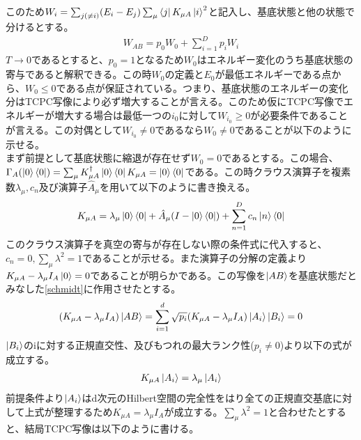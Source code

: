 \documentclass[a4paper,10.5pt]{article}
\numberwithin{equation}{section}
\begin{document}
このため$W_{i}=\sum_{j(\neq i)}(E_{i}-E_{j})\sum_{\mu}\bra{j}K_{\mu A}\ket{i}^{2}$と記入し、基底状態と他の状態で分けるとする。
\begin{equation}\begin{split}
    W_{AB}=p_{0}W_{0} +\sum_{i=1}^{D} p_{i}W_{i} \label{WAB}
\end{split} \end{equation}
$T \to 0$であるとすると、$p_{0}=1$となるため$W_{0}$はエネルギー変化のうち基底状態の寄与であると解釈できる。この時$W_{0}$の定義と$E_{0}$が最低エネルギーである点から、$W_{0}\leq 0$である点が保証されている。つまり、基底状態のエネルギーの変化分はTCPC写像により必ず増大することが言える。このため仮にTCPC写像でエネルギーが増大する場合は最低一つの$i_{0}$に対して$W_{i_{0}}\geq 0$が必要条件であることが言える。この対偶として$W_{i_{0}}\neq 0$であるなら$W_{0}\neq 0$であることが以下のように示せる。\\
まず前提として基底状態に縮退が存在せず$W_{0}=0$であるとする。この場合、$\Gamma_{A}(\ket{0}\bra{0})=\sum_{\mu}K_{\mu A}^{\dagger}\ket{0}\bra{0}K_{\mu A}=\ket{0}\bra{0}$である。この時クラウス演算子を複素数$\lambda_{\mu},c_{n}$及び演算子$\hat{A}_{\mu}$を用いて以下のように書き換える。
\begin{equation}\begin{split}
    K_{\mu A}=\lambda_{\mu}\ket{0}\bra{0} +\hat{A}_{\mu}(I-\ket{0}\bra{0}) 
    +\sum_{n=1}^{D} c_{n}\ket{n}\bra{0}
\end{split} \end{equation}
このクラウス演算子を真空の寄与が存在しない際の条件式に代入すると、$c_{n}=0,\sum_{\mu}\lambda^{2}=1$であることが示せる。また演算子の分解の定義より$K_{\mu A}-\lambda_{\mu}I_{A}\ket{0}=0$であることが明らかである。この写像を$\ket{AB}$を基底状態だとみなした\eqref{schmidt}に作用させたとする。
\begin{equation}\begin{split}
    (K_{\mu A}-\lambda_{\mu} I_{A})\ket{AB}=\sum_{i=1}^{d}\sqrt{p_{i}}(K_{\mu A}-\lambda_{\mu} I_{A})\ket{A_{i}}\ket{B_{i}}=0
\end{split} \end{equation}
$\ket{B_{i}}$のiに対する正規直交性、及びもつれの最大ランク性($p_{i}\neq 0$)より以下の式が成立する。
\begin{equation}\begin{split}
    K_{\mu A}\ket{A_{i}}=\lambda_{\mu}\ket{A_{i}}
\end{split} \end{equation}
前提条件より$\ket{A_{i}}$はd次元のHilbert空間の完全性をはり全ての正規直交基底に対して上式が整理するため$K_{\mu A}=\lambda_{\mu}I_{A}$が成立する。$\sum_{\mu}\lambda^{2}=1$と合わせたとすると、結局TCPC写像は以下のように書ける。
\end{document}
